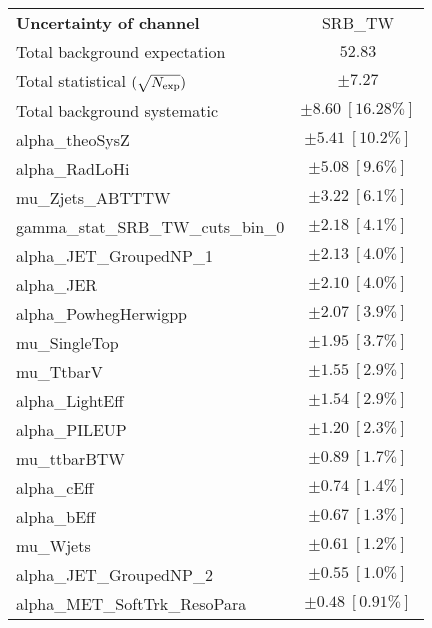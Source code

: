 
\begin{table}
\begin{center}
\setlength{\tabcolsep}{0.0pc}
\begin{tabular*}{\textwidth}{@{\extracolsep{\fill}}lc}
\noalign{\smallskip}\hline\noalign{\smallskip}
{\bf Uncertainty of channel}                                    & SRB\_TW            \\
\noalign{\smallskip}\hline\noalign{\smallskip}
Total background expectation             &  $52.83$       \\
\noalign{\smallskip}\hline\noalign{\smallskip}
Total statistical $(\sqrt{N_{\rm exp}})$              & $\pm 7.27$       \\
Total background systematic               & $\pm 8.60\ [16.28\%] $             \\
\noalign{\smallskip}\hline\noalign{\smallskip}
\noalign{\smallskip}\hline\noalign{\smallskip}
alpha\_theoSysZ         & $\pm 5.41\ [10.2\%] $       \\
alpha\_RadLoHi         & $\pm 5.08\ [9.6\%] $       \\
mu\_Zjets\_ABTTTW         & $\pm 3.22\ [6.1\%] $       \\
gamma\_stat\_SRB\_TW\_cuts\_bin\_0         & $\pm 2.18\ [4.1\%] $       \\
alpha\_JET\_GroupedNP\_1         & $\pm 2.13\ [4.0\%] $       \\
alpha\_JER         & $\pm 2.10\ [4.0\%] $       \\
alpha\_PowhegHerwigpp         & $\pm 2.07\ [3.9\%] $       \\
mu\_SingleTop         & $\pm 1.95\ [3.7\%] $       \\
mu\_TtbarV         & $\pm 1.55\ [2.9\%] $       \\
alpha\_LightEff         & $\pm 1.54\ [2.9\%] $       \\
alpha\_PILEUP         & $\pm 1.20\ [2.3\%] $       \\
mu\_ttbarBTW         & $\pm 0.89\ [1.7\%] $       \\
alpha\_cEff         & $\pm 0.74\ [1.4\%] $       \\
alpha\_bEff         & $\pm 0.67\ [1.3\%] $       \\
mu\_Wjets         & $\pm 0.61\ [1.2\%] $       \\
alpha\_JET\_GroupedNP\_2         & $\pm 0.55\ [1.0\%] $       \\
alpha\_MET\_SoftTrk\_ResoPara         & $\pm 0.48\ [0.91\%] $       \\

\end{tabular*}
\end{center}
\end{table}
